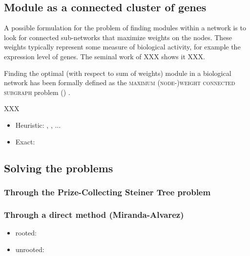 	\subsection{Module as a connected cluster of genes}

		A possible formulation for the problem of finding modules within a network is to look for connected sub-networks that maximize weights on the nodes.
		These weights typically represent some measure of biological activity, for example the expression level of genes.
		The seminal work of \textcite{ideker2002discovering} XXX shows it XXX.

		Finding the optimal (with respect to sum of weights) module in a biological network has been formally defined as the \textsc{maximum \mbox{(node-)weight} connected subgraph} problem (\mwcs{}) \cite{dittrich2008identifying}.

		XXX

		\begin{itemize}
			\item Heuristic: \cite{ideker2002discovering}, \cite{mitra2013integrative}, ...
			\item Exact: \cite{dittrich2008identifying}
		\end{itemize}

	\subsection{Solving the \mwcs{} problems}

		\subsubsection{Through the Prize-Collecting Steiner Tree problem}

		\subsubsection{Through a direct method (Miranda-Alvarez)}

			\begin{itemize}
				\item rooted: \cite{alvarez2013rooted}
				\item unrooted: \cite{alvarez2013maximum}
			\end{itemize}

